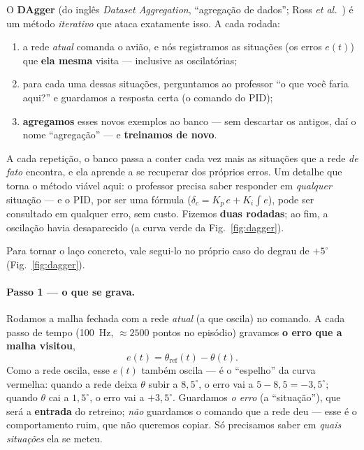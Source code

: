 \documentclass[11pt,a4paper]{article}
\newcommand{\thetaref}{\theta_{\mathrm{ref}}}
\begin{document}
O \textbf{DAgger} (do inglês \emph{Dataset Aggregation}, ``agregação de dados''; Ross
\emph{et al.}~\cite{ross2011}) é um método \emph{iterativo} que ataca exatamente isso.
A cada rodada:
\begin{enumerate}
  \item a rede \emph{atual} comanda o avião, e nós registramos as situações (os erros
        $e(t)$) que \textbf{ela mesma} visita --- inclusive as oscilatórias;
  \item para cada uma dessas situações, perguntamos ao professor ``o que você faria
        aqui?'' e guardamos a resposta certa (o comando do PID);
  \item \textbf{agregamos} esses novos exemplos ao banco --- sem descartar os antigos,
        daí o nome ``agregação'' --- e \textbf{treinamos de novo}.
\end{enumerate}
A cada repetição, o banco passa a conter cada vez mais as situações que a rede
\emph{de fato} encontra, e ela aprende a se recuperar dos próprios erros. Um detalhe que
torna o método viável aqui: o professor precisa saber responder em \emph{qualquer}
situação --- e o PID, por ser uma fórmula ($\delta_c=K_p\,e+K_i\!\int e$), pode ser
consultado em qualquer erro, sem custo. Fizemos \textbf{duas rodadas}; ao fim, a
oscilação havia desaparecido (a curva verde da Fig.~\ref{fig:dagger}).

Para tornar o laço concreto, vale segui-lo no próprio caso do degrau de $+5^\circ$
(Fig.~\ref{fig:dagger}).

\paragraph{Passo 1 --- o que se grava.} Rodamos a malha fechada com a rede \emph{atual}
(a que oscila) no comando. A cada passo de tempo (100~Hz, $\approx2500$ pontos no
episódio) gravamos \textbf{o erro que a malha visitou},
\[
  e(t)=\thetaref(t)-\theta(t).
\]
Como a rede oscila, esse $e(t)$ também oscila --- é o ``espelho'' da curva vermelha:
quando a rede deixa $\theta$ subir a $8{,}5^\circ$, o erro vai a $5-8{,}5=-3{,}5^\circ$;
quando $\theta$ cai a $1{,}5^\circ$, o erro vai a $+3{,}5^\circ$. Guardamos \emph{o erro}
(a ``situação''), que será a \textbf{entrada} do retreino; \emph{não} guardamos o
comando que a rede deu --- esse é o comportamento ruim, que não queremos copiar. Só
precisamos saber em \emph{quais situações} ela se meteu.
\end{document}
